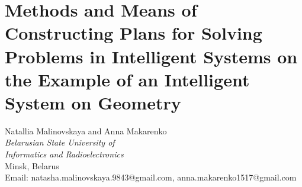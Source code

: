 \documentclass[10pt, a4paper]{article}
\begin{document}
\section*{\huge Methods and Means of Constructing Plans for Solving Problems in Intelligent Systems on the Example of an Intelligent System on Geometry}
\vspace{2mm}
\begin{center}
     Natallia Malinovskaya and Anna Makarenko\\
    \textit{ Belarusian State University of\\ Informatics and Radioelectronics}
     \\ Minsk, Belarus\\
 Email: natasha.malinovskaya.9843@gmail.com, anna.makarenko1517@gmail.com
\end{center}
\vspace{2pt}
\end{document}
